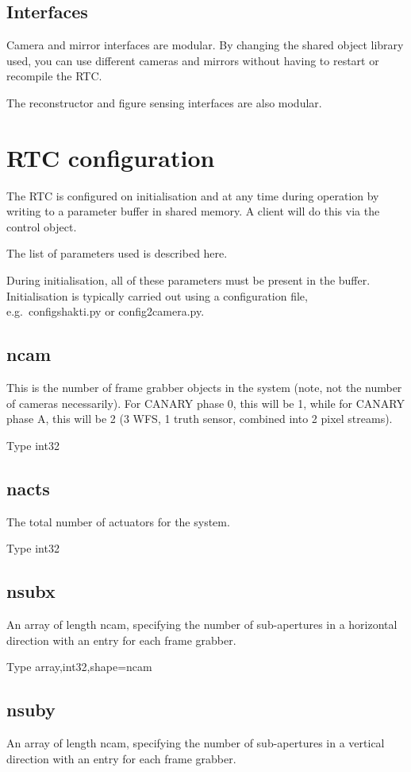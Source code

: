 \documentclass[a4,10pt]{article}
\begin{document}
\subsection{Interfaces}
Camera and mirror interfaces are modular.  By changing the shared
object library used, you can use different cameras
and mirrors without having to restart or recompile the RTC.  

The reconstructor and figure sensing interfaces are also modular.


\section{RTC configuration}
The RTC is configured on initialisation and at any time during
operation by writing to a parameter buffer in shared memory.  A client
will do this via the control object.

The list of parameters used is described here.

During initialisation, all of these parameters must be present in the
buffer.  Initialisation is typically carried out using a configuration
file, e.g.\ configshakti.py or config2camera.py.  

\subsection{ncam}
This is the number of frame grabber objects in the system (note, not
the number of cameras necessarily).  For CANARY phase 0, this will be
1, while for CANARY phase A, this will be 2 (3 WFS, 1 truth sensor,
combined into 2 pixel streams).

Type int32

\subsection{nacts}
The total number of actuators for the system.

Type int32

\subsection{nsubx}
An array of length ncam, specifying the number of sub-apertures in a
horizontal direction with an entry for each frame grabber.

Type array,int32,shape=ncam

\subsection{nsuby}
An array of length ncam, specifying the number of sub-apertures in a
vertical direction with an entry for each frame grabber.
\end{document}
